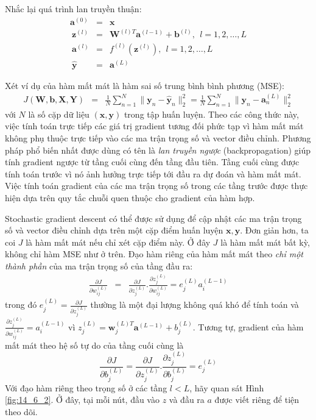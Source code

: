 Nhắc lại quá trình lan truyền thuận: 
\begin{eqnarray} 
\mathbf{a}^{(0)} &=& \mathbf{x} \\\
\mathbf{z}^{(l)}  &=& \mathbf{W}^{(l)T}\mathbf{a}^{(l-1)} + \mathbf{b}^{(l)},~~ l =  1, 2, \dots, L \\\ 
\mathbf{a}^{(l)} &=& f^{(l)}(\mathbf{z}^{(l)}), ~~ l =  1, 2, \dots, L \\\ 
\mathbf{\hat{y}} &=& \mathbf{a}^{(L)} 
\end{eqnarray} 


Xét ví dụ của hàm mất mát là hàm sai số trung bình bình phương (MSE):
\begin{eqnarray} 
J(\mathbf{W, b, X, Y}) &=& \frac{1}{N}\sum_{n=1}^N \| \mathbf{y}_n - \mathbf{\hat{y}}_n\|_2^2 
=\frac{1}{N}\sum_{n=1}^N \| \mathbf{y}_n - \mathbf{a}_n^{(L)}\|_2^2 
\end{eqnarray} 
với $N$ là số cặp dữ liệu $(\mathbf{x}, \mathbf{y})$ trong tập huấn luyện. Theo
các công thức này, việc tính toán trực tiếp các giá trị gradient tương đối phức
tạp vì hàm mất mát không phụ thuộc trực tiếp vào các ma trận trọng số và vector
điều chỉnh. Phương pháp phổ biến nhất được dùng có tên là \textit{lan truyền ngược}
(backpropagation) giúp tính gradient ngược từ tầng cuối cùng đến tầng đầu tiên.
Tầng cuối cùng được tính toán trước vì nó ảnh hưởng trực tiếp tới {đầu ra dự
đoán} và hàm mất mát. Việc tính toán gradient của các ma trận trọng số trong các
tầng trước được thực hiện dựa trên quy tắc chuỗi quen thuộc cho {gradient của hàm
hợp}.
 
Stochastic gradient descent có thể được sử dụng để cập nhật các ma trận trọng số và vector điều chỉnh dựa trên một cặp điểm huấn luyện $\mathbf{x, y}$. Đơn giản hơn, ta coi $J$ là hàm mất mát nếu chỉ xét cặp điểm này. Ở đây $J$ là hàm mất mát bất kỳ, không chỉ hàm MSE như ở trên. 
 Đạo hàm riêng của hàm mất mát theo \textit{chỉ một thành phần} của ma trận trọng số
của tầng đầu ra:
\begin{eqnarray} 
\frac{\partial J}{\partial w_{ij}^{(L)}} &=& \frac{\partial J}{\partial
z_j^{(L)}}. \frac{\partial z_j^{(L)}}{\partial w_{ij}^{(L)}} = e_j^{(L)} a_i^{(L-1)} 
\end{eqnarray} 
trong đó $\displaystyle e_j^{(L)} = \frac{\partial J}{\partial z_j^{(L)}} $
thường là một đại
lượng {không quá khó để tính toán} và $\displaystyle\frac{\partial
z_j^{(L)}}{\partial w_{ij}^{(L)}}  = a_i^{(L-1)}$ vì $z_j^{(L)} = \mathbf{w}_j^{(L)T}\mathbf{a}^{(L-1)} + b_j^{(L)}$.
Tương tự, gradient của hàm mất mát theo hệ số tự do của tầng cuối cùng là
\begin{equation} 
\frac{\partial J}{\partial b_{j}^{(L)}} = \frac{\partial J}{\partial z_j^{(L)}}. \frac{\partial z_j^{(L)}}{\partial b_{j}^{(L)}} = e_j^{(L)} 
\end{equation} 
Với đạo hàm riêng theo trọng số ở các tầng $l < L$, hãy quan sát Hình
\ref{fig:14_6_2}. Ở đây, tại mỗi nút, đầu vào $z$ và đầu ra $a$ được viết
riêng để tiện theo dõi.

